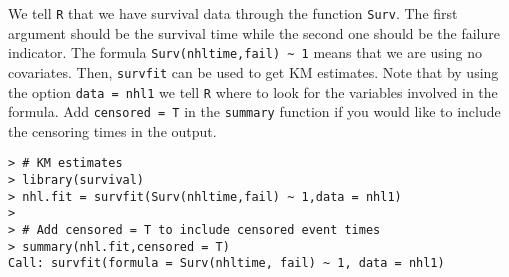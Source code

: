\begin{enumerate}[(a)]
We tell \verb|R| that we have survival data through the function \verb|Surv|. The first argument should be the survival time while the second one should be the failure indicator. The formula \verb|Surv(nhltime,fail) ~ 1| means that we are using no covariates.
Then, \verb|survfit|  can be used to get KM estimates.
 Note that by using the option \verb|data = nhl1| we tell \verb|R| where to look for the variables involved in the formula. Add \verb|censored = T| in the \verb|summary| function if you would like to include the censoring times in the output. 
\begin{footnotesize}
\begin{verbatim}
> # KM estimates
> library(survival)
> nhl.fit = survfit(Surv(nhltime,fail) ~ 1,data = nhl1)
> 
> # Add censored = T to include censored event times
> summary(nhl.fit,censored = T)
Call: survfit(formula = Surv(nhltime, fail) ~ 1, data = nhl1)


\end{verbatim}
\end{footnotesize}
\end{enumerate}
